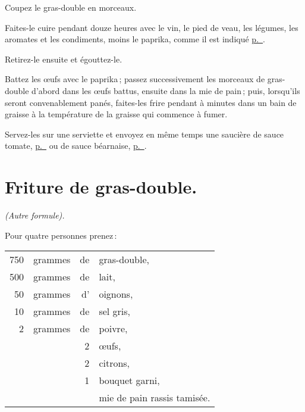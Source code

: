 Coupez le gras-double en {\mmm} morceaux.

Faites-le cuire pendant douze heures avec le vin, le pied de veau, les légumes,
les aromates et les condiments, moins le paprika, comme il est indiqué
\hyperlink{p0406}{p. \pageref{pg0406}}.

Retirez-le ensuite et égouttez-le.

Battez les œufs avec le paprika ; passez successivement les morceaux de
gras-double d'abord dans les œufs battus, ensuite dans la mie de pain ; puis,
lorsqu'ils seront convenablement panés, faites-les frire pendant {\mmm}
à {\mmm} minutes dans un bain de graisse à la température de la graisse
qui commence à fumer.

Servez-les sur une serviette et envoyez en même temps une saucière de sauce
tomate, \hyperlink{p0401}{p. \pageref{pg0401}} ou de sauce béarnaise,
\hyperlink{p0434}{p. \pageref{pg0434}}.

\section*{\centering Friture de gras-double.}

\begin{center}
\textit{(Autre formule).}
\end{center}

\medskip

Pour quatre personnes prenez :

\medskip

\footnotesize
\begin{longtable}{rrrp{18em}}
    750 & grammes & de & gras-double,                                                                     \\
    500 & grammes & de & lait,                                                                            \\
     50 & grammes & d' & oignons,                                                                         \\
     10 & grammes & de & sel gris,                                                                        \\
      2 & grammes & de & poivre,                                                                          \\
        &         &  2 & œufs,                                                                            \\
        &         &  2 & citrons,                                                                         \\
        &         &  1 & bouquet garni,                                                                   \\
        &         &    & mie de pain rassis tamisée.                                                      \\
\end{longtable}
\normalsize


